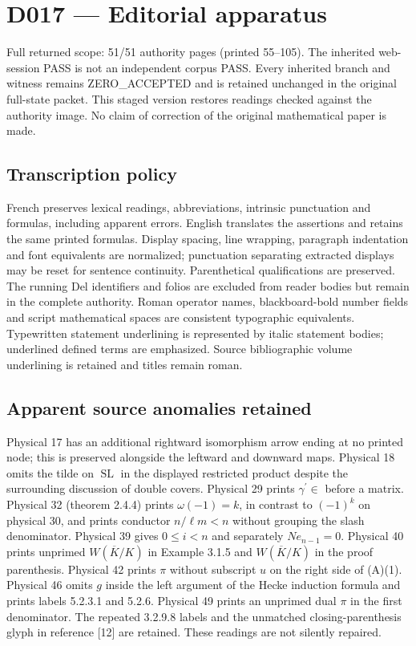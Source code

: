 \documentclass[10pt,a4paper]{article}
\providecommand{\SL}{\operatorname{SL}}
\begin{document}
\section*{D017 --- Editorial apparatus}
\noindent Full returned scope: 51/51 authority pages (printed 55--105). The inherited web-session PASS is not an independent corpus PASS. Every inherited branch and witness remains ZERO\_ACCEPTED and is retained unchanged in the original full-state packet. This staged version restores readings checked against the authority image. No claim of correction of the original mathematical paper is made.\par
\subsection*{Transcription policy}
French preserves lexical readings, abbreviations, intrinsic punctuation and formulas, including apparent errors. English translates the assertions and retains the same printed formulas. Display spacing, line wrapping, paragraph indentation and font equivalents are normalized; punctuation separating extracted displays may be reset for sentence continuity. Parenthetical qualifications are preserved. The running Del identifiers and folios are excluded from reader bodies but remain in the complete authority. Roman operator names, blackboard-bold number fields and script mathematical spaces are consistent typographic equivalents. Typewritten statement underlining is represented by italic statement bodies; underlined defined terms are emphasized. Source bibliographic volume underlining is retained and titles remain roman.\par
\subsection*{Apparent source anomalies retained}
Physical 17 has an additional rightward isomorphism arrow ending at no printed node; this is preserved alongside the leftward and downward maps. Physical 18 omits the tilde on $\SL$ in the displayed restricted product despite the surrounding discussion of double covers. Physical 29 prints $\gamma^{\prime}\in$ before a matrix. Physical 32 (theorem 2.4.4) prints $\omega(-1)=k$, in contrast to $(-1)^k$ on physical 30, and prints conductor $n/\ell m<n$ without grouping the slash denominator. Physical 39 gives $0\le i<n$ and separately $Ne_{n-1}=0$. Physical 40 prints unprimed $W(\overline K/K)$ in Example 3.1.5 and $W(\overline K/K)$ in the proof parenthesis. Physical 42 prints $\pi$ without subscript $u$ on the right side of (A)(1). Physical 46 omits $g$ inside the left argument of the Hecke induction formula and prints labels 5.2.3.1 and 5.2.6. Physical 49 prints an unprimed dual $\pi$ in the first denominator. The repeated 3.2.9.8 labels and the unmatched closing-parenthesis glyph in reference [12] are retained. These readings are not silently repaired.\par
\end{document}
